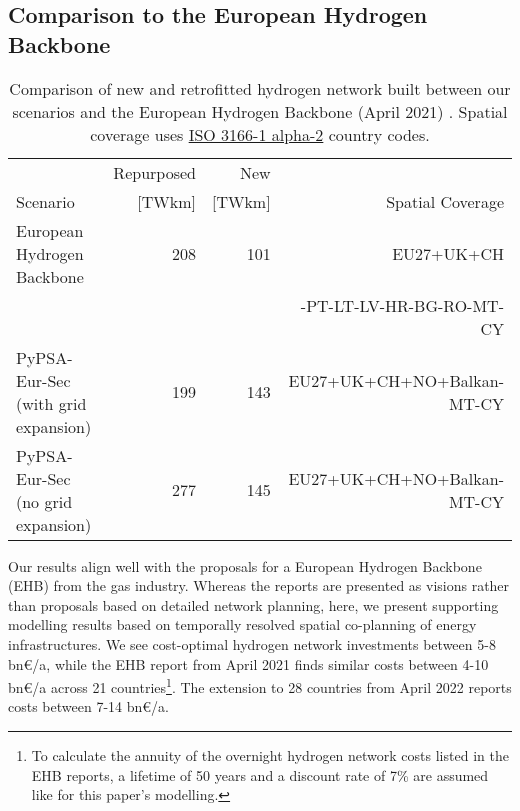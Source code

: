 
\subsection*{Comparison to the European Hydrogen Backbone}

\begin{table}
  \caption{Comparison of new and retrofitted hydrogen network built between our scenarios and the European Hydrogen Backbone (April 2021) \cite{gasforclimateExtendingEuropean2021}. Spatial coverage uses \href{https://en.wikipedia.org/wiki/ISO_3166-1_alpha-2}{ISO 3166-1 alpha-2} country codes.}
  \label{tab:ehb}
  \centering
  \footnotesize
  \begin{tabular}{lrrr}
      \toprule
       & Repurposed & New &  \\
       Scenario& [TWkm] & [TWkm] & Spatial Coverage \\
      \midrule
      European Hydrogen Backbone \cite{gasforclimateExtendingEuropean2021} & 208 & 101 & EU27+UK+CH\\
      && & -PT-LT-LV-HR-BG-RO-MT-CY\\
      PyPSA-Eur-Sec (with grid expansion) & 199 & 143 & EU27+UK+CH+NO+Balkan-MT-CY \\
      PyPSA-Eur-Sec (no grid expansion) & 277 & 145 & EU27+UK+CH+NO+Balkan-MT-CY \\
      \bottomrule
    \end{tabular}
\end{table}

Our results align well with the proposals for a European Hydrogen Backbone (EHB)
from the gas industry.\cite{gasforclimateEuropeanHydrogen2020,gasforclimateExtendingEuropean2021,gasforclimateEuropeanHydrogen2021,gasforclimateEuropeanHydrogen2022}
Whereas the reports are presented as visions rather than proposals based on
detailed network planning, here, we present supporting modelling results based
on temporally resolved spatial co-planning of energy infrastructures. We see
cost-optimal hydrogen network investments between 5-8 bn\euro/a, while the EHB
report from April 2021 \cite{gasforclimateExtendingEuropean2021} finds similar
costs between 4-10 bn\euro/a across 21 countries\footnote{To calculate the
annuity of the overnight hydrogen network costs listed in the EHB reports, a
lifetime of 50 years and a discount rate of 7\% are assumed like for this paper's
modelling.}. The extension to 28 countries from April 2022
\cite{gasforclimateEuropeanHydrogen2022} reports costs between 7-14 bn\euro/a.

